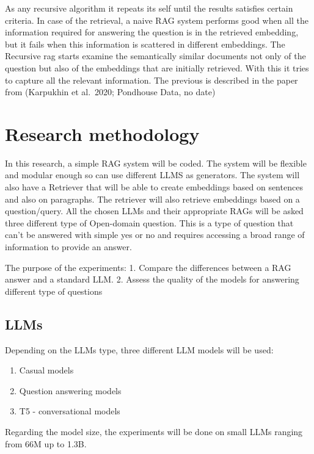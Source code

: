 \documentclass{wseas}
\begin{document}
As any recursive algorithm it repeats its self until the results
satisfies certain criteria. In case of the retrieval, a naive RAG system
performs good when all the information required for answering the
question is in the retrieved embedding, but it fails when this
information is scattered in different embeddings. The Recursive rag
starts examine the semantically similar documents not only of the
question but also of the embeddings that are initially retrieved. With
this it tries to capture all the relevant information. The previous is
described in the paper from (Karpukhin et al.~2020; Pondhouse Data, no
date) \cite{cite16} \cite{cite17}


\section{Research methodology}

In this research, a simple RAG system will be coded. The system will be
flexible and modular enough so can use different LLMS as generators. The
system will also have a Retriever that will be able to create embeddings
based on sentences and also on paragraphs. The retriever will also
retrieve embeddings based on a question/query. All the chosen LLMs and
their appropriate RAGs will be asked three different type of Open-domain
question. This is a type of question that can't be answered with simple
yes or no and requires accessing a broad range of information to provide
an answer.

The purpose of the experiments: 1. Compare the differences between a RAG
answer and a standard LLM. 2. Assess the quality of the models for
answering different type of questions

\subsection{LLMs}

Depending on the LLMs type, three different LLM models will be used:

\begin{enumerate}
\def\labelenumi{\arabic{enumi}.}
\item
  Casual models
\item
  Question answering models
\item
  T5 - conversational models
\end{enumerate}

Regarding the model size, the experiments will be done on small LLMs
ranging from 66M up to 1.3B.
\end{document}
